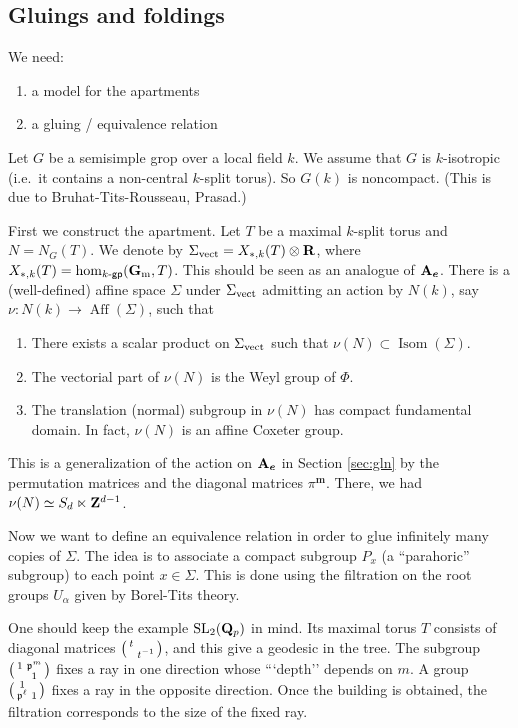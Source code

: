 \documentclass{article}
\begin{document}
\subsection{Gluings and foldings}

We need:
\begin{enumerate}
  \item a model for the apartments
  \item a gluing / equivalence relation 
\end{enumerate}

Let $G$ be a semisimple grop over a local field $k$. We assume that $G$ is 
$k$-isotropic (i.e.\ it contains a non-central $k$-split torus). So 
$G(k)$ is noncompact. (This is due to Bruhat-Tits-Rousseau, Prasad.) 

First we construct the apartment. Let $T$ be a maximal $k$-split torus and 
$N=N_G(T)$. We denote by $\Sigma_{\mathrm{vect}} = X_{\ast,k}(T)\otimes\mathbf{R}$, where 
$X_{\ast,k}(T)=\hom_{k\textnormal{-}\mathsf{gp}}(\mathbf{G}_{\mathrm{m}},T)$. This should 
be seen as an analogue of $\mathbf{A}_{\boldsymbol e}$. There is a (well-defined) 
affine space $\Sigma$ under $\Sigma_{\mathrm{vect}}$ admitting an action by 
$N(k)$, say $\nu:N(k) \to \operatorname{Aff}(\Sigma)$, such that 
\begin{enumerate}
  \item There exists a scalar product on $\Sigma_{\mathrm{vect}}$ such that 
    $\nu(N) \subset \operatorname{Isom}(\Sigma)$. 
  \item The vectorial part of $\nu(N)$ is the Weyl group of $\Phi$. 
  \item The translation (normal) subgroup in $\nu(N)$ has compact fundamental 
    domain. In fact, $\nu(N)$ is an affine Coxeter group. 
\end{enumerate}

This is a generalization of the action on $\mathbf{A}_{\boldsymbol e}$ in 
Section \ref{sec:gln} by the permutation matrices and the diagonal 
matrices $\pi^{\boldsymbol m}$. There, we had 
$\nu(N)\simeq S_d\ltimes \mathbf{Z}^{d-1}$. 

Now we want to define an equivalence relation in order to glue infinitely 
many copies of $\Sigma$. The idea is to associate a compact subgroup 
$P_x$ (a ``parahoric'' subgroup) to each point $x\in \Sigma$. This is done 
using the filtration on the root groups $U_\alpha$ given by Borel-Tits 
theory. 

One should keep the example $\operatorname{SL}_2(\mathbf{Q}_p)$ in mind. Its 
maximal torus $T$ consists of diagonal matrices $\bigl(\begin{smallmatrix} t &  \\  & t^{-1} \end{smallmatrix} \bigr)$, 
and this give a geodesic in the tree. The subgroup 
$\bigl(\begin{smallmatrix} 1 & \mathfrak{p}^m \\  & 1 \end{smallmatrix} \bigr)$ fixes a ray in one direction whose ```depth'' depends 
on $m$. A group $\bigl(\begin{smallmatrix} 1 &  \\ \mathfrak{p}^\ell & 1 \end{smallmatrix} \bigr)$ fixes a ray in the opposite 
direction. Once the building is obtained, the filtration corresponds to the 
size of the fixed ray. 
\end{document}
